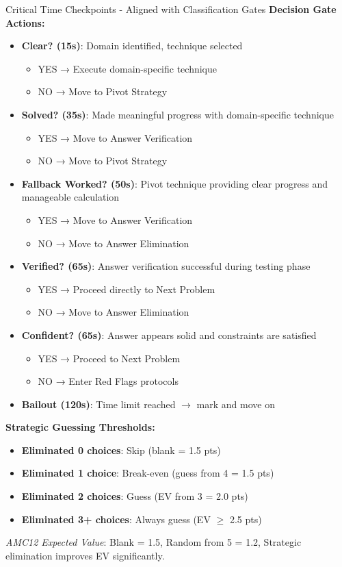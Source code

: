 \documentclass{article}
\begin{document}
\begin{timebox}{Critical Time Checkpoints - Aligned with Classification Gates}
\textbf{Decision Gate Actions:}
\begin{itemize}[nosep]
\item \textbf{Clear? (15s)}: Domain identified, technique selected
 \begin{itemize}[nosep]
     \item YES → Execute domain-specific technique
     \item NO → Move to Pivot Strategy
 \end{itemize}
\item \textbf{Solved? (35s)}: Made meaningful progress with domain-specific technique
   \begin{itemize}[nosep]
   \item YES → Move to Answer Verification
   \item NO → Move to Pivot Strategy
   \end{itemize}
\item \textbf{Fallback Worked? (50s)}: Pivot technique providing clear progress and manageable calculation
   \begin{itemize}[nosep]
   \item YES → Move to Answer Verification
   \item NO → Move to Answer Elimination
   \end{itemize}
\item \textbf{Verified? (65s)}: Answer verification successful during testing phase
   \begin{itemize}[nosep]
   \item YES → Proceed directly to Next Problem
   \item NO → Move to Answer Elimination
   \end{itemize}
\item \textbf{Confident? (65s)}: Answer appears solid and constraints are satisfied
   \begin{itemize}[nosep]
   \item YES → Proceed to Next Problem
   \item NO → Enter Red Flags protocols
   \end{itemize}
\item \textbf{Bailout (120s)}: Time limit reached $\rightarrow$ mark and move on
\end{itemize}

\textbf{Strategic Guessing Thresholds:}
\begin{itemize}[nosep]
\item \textbf{Eliminated 0 choices}: Skip (blank = 1.5 pts)
\item \textbf{Eliminated 1 choice}: Break-even (guess from 4 = 1.5 pts)
\item \textbf{Eliminated 2 choices}: Guess (EV from 3 = 2.0 pts)
\item \textbf{Eliminated 3+ choices}: Always guess (EV $\geq$ 2.5 pts)
\end{itemize}

\textit{AMC12 Expected Value}: Blank = 1.5, Random from 5 = 1.2, Strategic elimination improves EV significantly.
\end{timebox}
\end{document}
